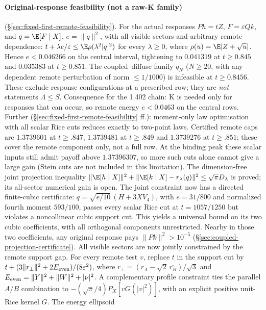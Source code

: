 \paragraph{Original-response feasibility (not a raw-K family)} (\S\ref{sec:fixed-first-remote-feasibility}). For the actual responses $Ph=tZ$, $F=\varepsilon Qk$, and
$q=\E[F\mid X]$, $e=\|q\|^2$, with all visible sectors and arbitrary remote dependence: $t+\lambda e/\varepsilon\le\E\rho(\lambda^2|q|^2)$ for every $\lambda\ge0$, where
$\rho(u)=\E|Z+\sqrt u|$. Hence $e<0.046266$ on the central interval, tightening to $0.041319$ at $t\ge0.845$ and $0.035383$ at $t\ge0.851$. The coupled--diffuse
family $q_N$ ($N\ge20$, with any dependent remote perturbation of norm $\le1/1000$) is infeasible at $t\ge0.8456$. These exclude response configurations at a
prescribed row; they are \emph{not} statements $\Lambda\le S$. Consequence for the 1.402 chain: K is needed only for responses that can occur, so remote
energy $e<0.0463$ on the central rows. Further (\S\ref{sec:fixed-first-remote-feasibility} ff.): moment-only law optimisation with all scalar Rice cuts reduces exactly
to two-point laws. Certified remote caps are $1.3739601$ at $t\ge.847$, $1.3739481$ at $t\ge.849$ and $1.3739276$ at $t\ge.851$; these cover the remote component
only, not a full row. At the binding peak these scalar inputs still admit payoff above $1.37396307$, so more such cuts alone cannot give a large gain (Stein cuts
are not included in this limitation). The dimension-free joint projection inequality $\|\E[h\mid X]\|^2+\|\E[k\mid X]-r_\lambda(q)\|^2\le\sqrt\pi D_\lambda$ is proved;
its all-sector numerical gain is open. The joint constraint now has a directed finite-cubic certificate: $q=\sqrt{e/10}\,(H+3XV_4)$, with $e=31/800$ and normalized fourth moment
$593/100$, passes every scalar Rice cut at $t=1057/1250$ but violates a noncollinear cubic support cut. This yields a universal bound on its two cubic coefficients,
with all orthogonal components unrestricted. Nearby in those two coefficients, any original response pays $\|Pk\|^2>10^{-5}$
(\S\ref{sec:coupled-projection-certificate}). All visible sectors are now jointly constrained by the remote support gap. For every remote test $v$, replace $t$ in the support cut by
$t+(3\|r_\perp\|^2+2E_{\rm even})/(8\varepsilon^2)$, where $r_\perp=(r_A-\sqrt2\,\overline{r_B})/\sqrt3$ and $E_{\rm even}=\|Y\|^2+\|W\|^2+|\nu|^2$. A complementary profile
constraint ties the parallel $A/B$ combination to $-(\sqrt\pi/4)P_X[vG(|v|^2)]$, with an explicit positive unit-Rice kernel $G$. The energy ellipsoid
